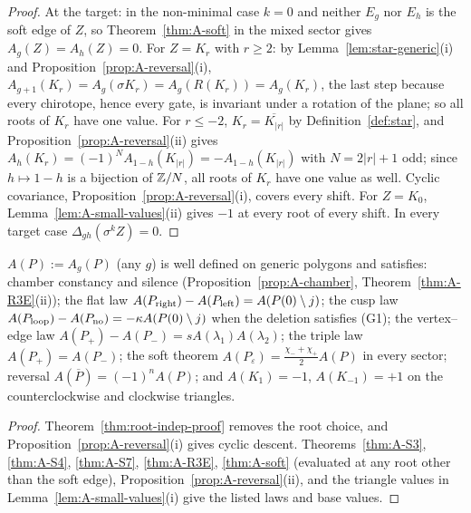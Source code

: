 \begin{proof}
At the target: in the non-minimal case $k=0$ and neither $E_g$ nor $E_h$ is
the soft edge of $Z$, so Theorem~\ref{thm:A-soft} in the mixed sector gives
$A_g(Z)=A_h(Z)=0$. For $Z=K_r$ with $r\geq2$: by Lemma~\ref{lem:star-generic}(i) and
Proposition~\ref{prop:A-reversal}(i),
$A_{g+1}(K_r)=A_g(\sigma K_r)=A_g(R(K_r))=A_g(K_r)$, the last step because
every chirotope, hence every gate, is invariant under a rotation of the plane;
so all roots of $K_r$ have one value. For $r\leq-2$, $K_r=\overline{K_{|r|}}$
by Definition~\ref{def:star}, and Proposition~\ref{prop:A-reversal}(ii) gives
$A_h(K_r)=(-1)^NA_{1-h}(K_{|r|})=-A_{1-h}(K_{|r|})$ with $N=2|r|+1$ odd; since
$h\mapsto1-h$ is a bijection of $\mathbb Z/N$, all roots of $K_r$ have one value as
well. Cyclic covariance, Proposition~\ref{prop:A-reversal}(i), covers every
shift. For $Z=K_0$, Lemma~\ref{lem:A-small-values}(ii) gives $-1$ at every
root of every shift. In every target case $\Delta_{gh}(\sigma^kZ)=0$.
\end{proof}

\begin{corollary}\label{cor:A-lawful}
$A(P):=A_g(P)$ (any $g$) is well defined on generic polygons and satisfies:
chamber constancy and silence (Proposition~\ref{prop:A-chamber},
Theorem~\ref{thm:A-R3E}(ii)); the flat law
$A(P_{\rm right})-A(P_{\rm left})=A(P(0)\setminus j)$; the cusp law
$A(P_{\rm loop})-A(P_{\rm no})=-\kappa A(P(0)\setminus j)$ when the deletion
satisfies (G1); the vertex--edge law $A(P_+)-A(P_-)=sA(\lambda_1)A(\lambda_2)$;
the triple law $A(P_+)=A(P_-)$; the soft theorem
$A(P_\varepsilon)=\frac{\chi_-+\chi_+}2A(P)$ in every sector; reversal
$A(\overline P)=(-1)^nA(P)$; and $A(K_1)=-1$, $A(K_{-1})=+1$ on the
counterclockwise and clockwise triangles. 
\end{corollary}
\begin{proof}
Theorem~\ref{thm:root-indep-proof} removes the root choice, and
Proposition~\ref{prop:A-reversal}(i) gives cyclic descent.
Theorems~\ref{thm:A-S3}, \ref{thm:A-S4}, \ref{thm:A-S7}, \ref{thm:A-R3E},
\ref{thm:A-soft} (evaluated at any root other than the soft edge),
Proposition~\ref{prop:A-reversal}(ii), and the triangle values in
Lemma~\ref{lem:A-small-values}(i) give the listed laws and base values.
\end{proof}

